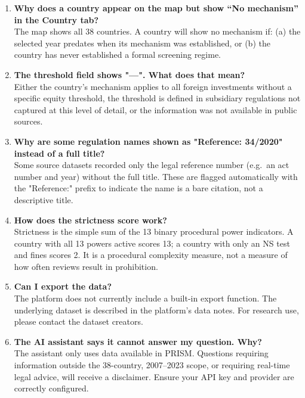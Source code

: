 \documentclass[12pt,a4paper]{article}
\begin{document}
\begin{enumerate}[label=\textbf{Q\arabic*.}]

\item \textbf{Why does a country appear on the map but show ``No mechanism'' in the Country tab?}\\
The map shows all 38 countries. A country will show no mechanism if: (a) the selected year predates when its mechanism was established, or (b) the country has never established a formal screening regime.

\item \textbf{The threshold field shows "—". What does that mean?}\\
Either the country's mechanism applies to all foreign investments without a specific equity threshold, the threshold is defined in subsidiary regulations not captured at this level of detail, or the information was not available in public sources.

\item \textbf{Why are some regulation names shown as "Reference: 34/2020" instead of a full title?}\\
Some source datasets recorded only the legal reference number (e.g.\ an act number and year) without the full title. These are flagged automatically with the "Reference:" prefix to indicate the name is a bare citation, not a descriptive title.

\item \textbf{How does the strictness score work?}\\
Strictness is the simple sum of the 13 binary procedural power indicators. A country with all 13 powers active scores 13; a country with only an NS test and fines scores 2. It is a procedural complexity measure, not a measure of how often reviews result in prohibition.

\item \textbf{Can I export the data?}\\
The platform does not currently include a built-in export function. The underlying dataset is described in the platform's data notes. For research use, please contact the dataset creators.

\item \textbf{The AI assistant says it cannot answer my question. Why?}\\
The assistant only uses data available in PRISM. Questions requiring information outside the 38-country, 2007--2023 scope, or requiring real-time legal advice, will receive a disclaimer. Ensure your API key and provider are correctly configured.


\end{enumerate}
\end{document}
